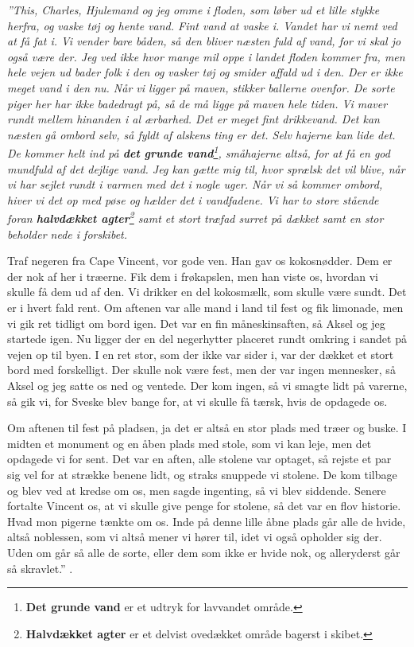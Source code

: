 \emph{''This, Charles, Hjulemand og jeg omme i floden, som løber ud et
lille stykke herfra, og vaske tøj og hente vand. Fint vand at vaske i.
Vandet har vi nemt ved at få fat i. Vi vender bare båden, så den bliver
næsten fuld af vand, for vi skal jo også være der. Jeg ved ikke hvor
mange mil oppe i landet floden kommer fra, men hele vejen ud bader folk
i den og vasker tøj og smider affald ud i den. Der er ikke meget vand i
den nu. Når vi ligger på maven, stikker ballerne ovenfor. De sorte piger
her har ikke badedragt på, så de må ligge på maven hele tiden. Vi maver
rundt mellem hinanden i al ærbarhed. Det er meget fint drikkevand. Det
kan næsten gå ombord selv, så fyldt af alskens ting er det. Selv hajerne
kan lide det. De kommer helt ind på \textbf{det grunde vand}\footnote{\textbf{Det
  grunde vand} er et udtryk for lavvandet område.}, småhajerne altså,
for at få en god mundfuld af det dejlige vand. Jeg kan gætte mig til,
hvor sprælsk det vil blive, når vi har sejlet rundt i varmen med det i
nogle uger. Når vi så kommer ombord, hiver vi det op med pøse og hælder
det i vandfadene. Vi har to store stående foran \textbf{halvdækket
agter}\footnote{\textbf{Halvdækket agter} er et delvist ovedækket område
  bagerst i skibet.} samt et stort træfad surret på dækket samt en stor
beholder nede i forskibet.}

Traf negeren fra Cape Vincent, vor gode ven. Han gav os kokosnødder. Dem
er der nok af her i træerne. Fik dem i frøkapslen, men han viste os,
hvordan vi skulle få dem ud af den. Vi drikker en del kokosmælk, som
skulle være sundt. Det er i hvert fald rent. Om aftenen var alle mand i
land til fest og fik limonade, men vi gik ret tidligt om bord igen. Det
var en fin måneskinsaften, så Aksel og jeg startede igen. Nu ligger der
en del negerhytter placeret rundt omkring i sandet på vejen op til byen.
I en ret stor, som der ikke var sider i, var der dækket et stort bord
med forskelligt. Der skulle nok være fest, men der var ingen mennesker,
så Aksel og jeg satte os ned og ventede. Der kom ingen, så vi smagte
lidt på varerne, så gik vi, for Sveske blev bange for, at vi skulle få
tærsk, hvis de opdagede os.

Om aftenen til fest på pladsen, ja det er altså en stor plads med træer
og buske. I midten et monument og en åben plads med stole, som vi kan
leje, men det opdagede vi for sent. Det var en aften, alle stolene var
optaget, så rejste et par sig vel for at strække benene lidt, og straks
snuppede vi stolene. De kom tilbage og blev ved at kredse om os, men
sagde ingenting, så vi blev siddende. Senere fortalte Vincent os, at vi
skulle give penge for stolene, så det var en flov historie. Hvad mon
pigerne tænkte om os. Inde på denne lille åbne plads går alle de hvide,
altså noblessen, som vi altså mener vi hører til, idet vi også opholder
sig der. Uden om går så alle de sorte, eller dem som ikke er hvide nok,
og alleryderst går så skravlet.'' .

